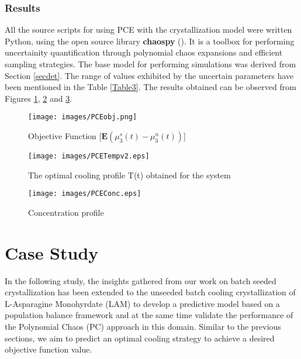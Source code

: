 \documentclass[3p,times,authoryear]{elsarticle}
\begin{document}
\subsubsection{Results}

All the source scripts for using PCE with the crystallization model were written Python, using the open source library \textbf{chaospy} (\cite{chaospy}). It is a toolbox for performing uncertainity quantification through polynomial chaos expansions and efficient sampling strategies. The base model for performing simulations was derived from Section \ref{secdet}. The range of values exhibited by the uncertain parameters have been mentioned in the Table \ref{Table3}. The results obtained can be observed from Figures \ref{PCEObj}, \ref{PCETemp} and \ref{PCEConc}.



\begin{figure}[h!] 
\begin{center}
\texttt{[image: images/PCEobj.png]} 
\end{center}
\caption{Objective Function [$\mathbf{E}(\mu_{3}^{s}(t) - \mu_{3}^{n}(t))$]} \label{PCEObj}
\end{figure}


\begin{figure}[h!] 
\begin{center} 
\texttt{[image: images/PCETempv2.eps]} 
\end{center}
\caption{The optimal cooling profile T(t) obtained for the system} \label{PCETemp}
\end{figure}

\begin{figure}[h!] 

\begin{center}
\texttt{[image: images/PCEConc.eps]} 
\end{center}
\caption{Concentration profile} \label{PCEConc}
\end{figure}

\section{Case Study}

In the following study, the insights gathered from our work on batch seeded crystallization has been extended to the unseeded batch cooling crystallization of L-Asparagine Monohyrdate (LAM) to develop a predictive model based on a population balance framework and at the same time validate the performance of the Polynomial Chaos (PC) approach in this domain. Similar to the previous sections, we aim to predict an optimal cooling strategy to achieve a desired objective function value.
\end{document}
